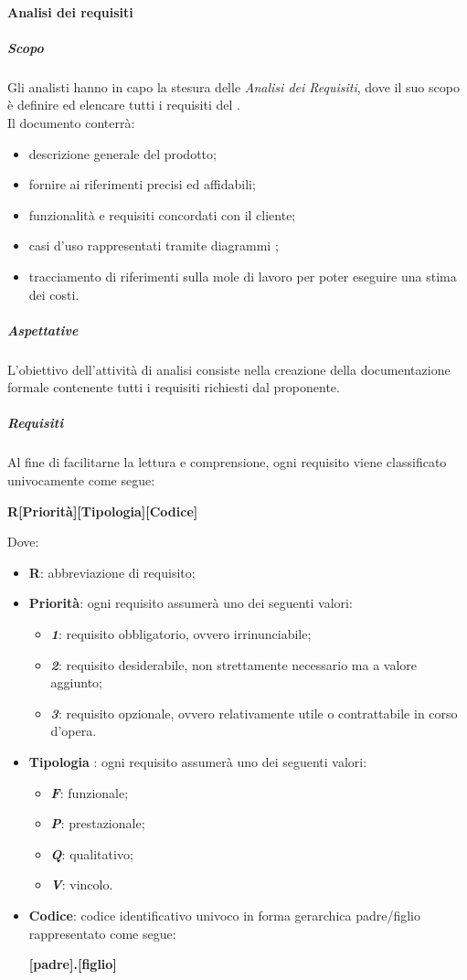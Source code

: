			\paragraph{Analisi dei requisiti}
				\subparagraph{Scopo}
				Gli analisti hanno in capo la stesura delle \textit{Analisi dei Requisiti}, dove il suo scopo è definire ed elencare tutti i requisiti del .
				\\ 
				Il documento conterrà:
				\begin{itemize}
					\item descrizione generale del prodotto;
					\item fornire ai  riferimenti precisi ed affidabili;
					\item funzionalità e requisiti concordati con il cliente;
					\item casi d'uso rappresentati tramite diagrammi ;	
					\item tracciamento di riferimenti sulla mole di lavoro per poter eseguire una stima dei costi.			
				\end{itemize}
				\subparagraph{Aspettative}
				L'obiettivo dell'attività di analisi consiste nella creazione della documentazione formale contenente tutti i requisiti richiesti dal proponente.
				\subparagraph{Requisiti}
				Al fine di facilitarne la lettura e comprensione, ogni requisito viene classificato univocamente come segue:				
				\begin{center}
					\textbf{R[Priorità][Tipologia][Codice]}
				\end{center}
				Dove:
				\begin{itemize}
					\item \textbf{R}: abbreviazione di requisito;
					\item \textbf{Priorità}: ogni requisito assumerà uno dei seguenti valori:
					\begin{itemize}
						\item \textbf{\textit{1}}: requisito obbligatorio, ovvero irrinunciabile;
						\item \textbf{\textit{2}}: requisito desiderabile, non strettamente necessario ma a valore aggiunto;
						\item \textbf{\textit{3}}: requisito opzionale, ovvero relativamente utile o contrattabile in corso d'opera.
					\end{itemize}
					\item \textbf{Tipologia} : ogni requisito assumerà uno dei seguenti valori:
					\begin{itemize}
						\item \textbf{\textit{F}}: funzionale;
						\item \textbf{\textit{P}}: prestazionale;
						\item \textbf{\textit{Q}}: qualitativo;
						\item \textbf{\textit{V}}: vincolo.
					\end{itemize}
					\item \textbf{Codice}: codice identificativo univoco in forma gerarchica padre/figlio rappresentato come segue:
					\begin{center}
						\textbf{[padre].[figlio]}
					\end{center}
				\end{itemize}				
